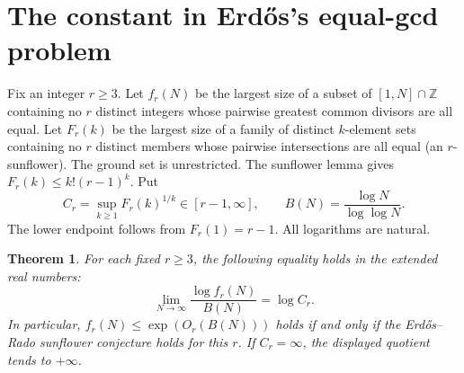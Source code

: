 \documentclass[11pt,a4paper]{article}
\newtheorem{theorem}{Theorem}[section]
\begin{document}
\section{The constant in Erd\H{o}s's equal-gcd problem}\label{sec:gcd-sunflower}
\begingroup\setlength{\emergencystretch}{1.5em}
Fix an integer $r\ge3$. Let $f_r(N)$ be the largest size of a subset of
$[1,N]\cap\mathbb Z$ containing no $r$ distinct integers whose pairwise
greatest common divisors are all equal. Let $F_r(k)$ be the largest size
of a family of distinct $k$-element sets containing no $r$ distinct
members whose pairwise intersections are all equal (an $r$-sunflower).
The ground set is unrestricted. The sunflower lemma gives
$F_r(k)\le k!(r-1)^k$. Put
\[
 C_r=\sup_{k\ge1} F_r(k)^{1/k}\in[r-1,\infty],\qquad
 B(N)=\frac{\log N}{\log\log N}.
\]
The lower endpoint follows from $F_r(1)=r-1$. All logarithms are natural.

\begin{theorem}\label{thm:gcd-sunflower-constant}
For each fixed $r\ge3$, the following equality holds in the extended real
numbers:
\[
 \lim_{N\to\infty}\frac{\log f_r(N)}{B(N)}=\log C_r.
\]
In particular, $f_r(N)\le\exp(O_r(B(N)))$ holds if and only if the
Erd\H{o}s--Rado sunflower conjecture holds for this $r$. If $C_r=\infty$,
the displayed quotient tends to $+\infty$.
\end{theorem}
\end{document}
